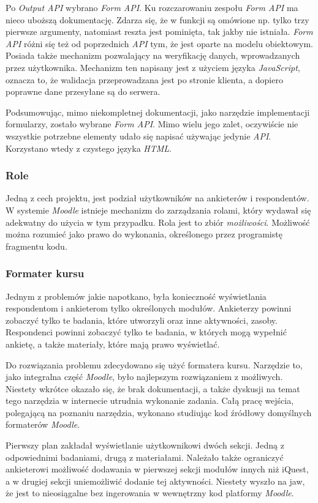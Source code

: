 \documentclass[12pt]{report}
\begin{document}
Po \emph{Output API} wybrano \emph{Form API}. Ku rozczarowaniu zespołu \emph{Form API} ma nieco uboższą dokumentację. Zdarza się, że w funkcji są omówione np. tylko trzy pierwsze argumenty, natomiast reszta jest pominięta, tak jakby nie istniała. \emph{Form API} różni się też od poprzednich \emph{API} tym, że jest oparte na modelu obiektowym. Posiada także mechanizm pozwalający na weryfikację danych, wprowadzanych przez użytkownika. Mechanizm ten napisany jest z użyciem języka \emph{JavaScript}, oznacza to, że walidacja przeprowadzana jest po stronie klienta, a dopiero poprawne dane przesyłane są do serwera.

Podsumowując, mimo niekompletnej dokumentacji, jako narzędzie implementacji formularzy, zostało wybrane \emph{Form API}. Mimo wielu jego zalet, oczywiście nie wszystkie potrzebne elementy udało się napisać używając jedynie \emph{API}. Korzystano wtedy z czystego języka \emph{HTML}. 

\subsubsection{Role}
Jedną z cech projektu, jest podział użytkowników na ankieterów i respondentów. W systemie \emph{Moodle} istnieje mechanizm do zarządzania rolami, który wydawał się adekwatny do użycia w tym przypadku. Rola jest to zbiór \emph{możliwości}. Możliwość można rozumieć jako prawo do wykonania, określonego przez programistę fragmentu kodu.

\subsubsection{Formater kursu}
Jednym z problemów jakie napotkano, była konieczność wyświetlania respondentom i ankieterom tylko określonych modułów. Ankieterzy powinni zobaczyć tylko te badania, które utworzyli oraz inne aktywności, zasoby. Respondenci powinni zobaczyć tylko te badania, w których mogą wypełnić ankietę, a także materiały, które mają prawo wyświetlać.

Do rozwiązania problemu zdecydowano się użyć formatera kursu. Narzędzie to, jako integralna część \emph{Moodle}, było najlepszym rozwiązaniem z możliwych. Niestety wkrótce okazało się, że brak dokumentacji, a także dyskusji na temat tego narzędzia w internecie utrudnia wykonanie zadania. Całą pracę wejścia, polegającą na poznaniu narzędzia, wykonano studiując kod źródłowy domyślnych formaterów \emph{Moodle}.

Pierwszy plan zakładał wyświetlanie użytkownikowi dwóch sekcji. Jedną z odpowiednimi badaniami, drugą z materiałami. Należało także ograniczyć ankieterowi możliwość dodawania w pierwszej sekcji modułów innych niż iQuest, a w drugiej sekcji uniemożliwić dodanie tej aktywności. Niestety wyszło na jaw, że jest to nieosiągalne bez ingerowania w wewnętrzny kod platformy \emph{Moodle}. 
\end{document}
